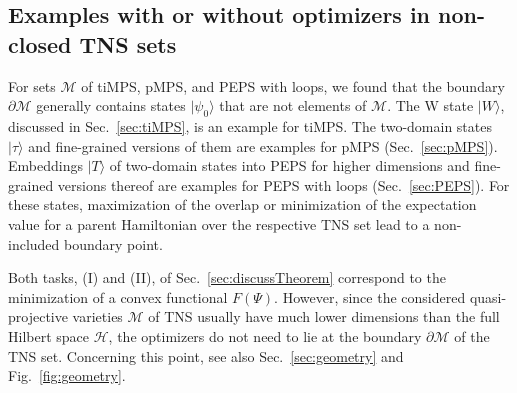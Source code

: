 \documentclass[english,11pt,aps,pra,onecolumn,tightenlines,groupedaddress,superscriptaddress,notitlepage,floatfix,fleqn]{revtex4-1}
\newcommand{\ket}{\rangle}
\newcommand{\mc}[1]{\mathcal{#1}}
\renewcommand{\H}{\mc{H}}
\newcommand{\M}{\mc{M}}
\begin{document}
\subsection{Examples with or without optimizers in non-closed TNS sets}
For sets $\M$ of tiMPS, pMPS, and PEPS with loops, we found that the boundary $\partial\M$ generally contains states $|\psi_0\ket$ that are not elements of $\M$. The W state $|W\ket$, discussed in Sec.~\ref{sec:tiMPS}, is an example for tiMPS. The two-domain states $|\tau\ket$ and fine-grained versions of them are examples for pMPS (Sec.~\ref{sec:pMPS}). Embeddings $|T\ket$ of two-domain states into PEPS for higher dimensions and fine-grained versions thereof are examples for PEPS with loops (Sec.~\ref{sec:PEPS}). For these states, maximization of the overlap or minimization of the expectation value for a parent Hamiltonian over the respective TNS set lead to a non-included boundary point.

Both tasks, (I) and (II), of Sec.~\ref{sec:discussTheorem} correspond to the minimization of a convex functional $F(\Psi)$. However, since the considered quasi-projective varieties $\M$ of TNS usually have much lower dimensions than the full Hilbert space $\H$, the optimizers do not need to lie at the boundary $\partial\M$ of the TNS set. Concerning this point, see also Sec.~\ref{sec:geometry} and Fig.~\ref{fig:geometry}.
\end{document}
